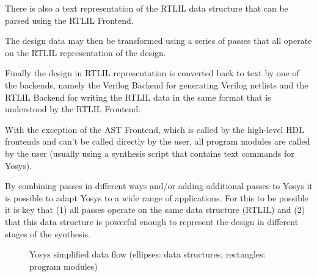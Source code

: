 There is also a text representation of the RTLIL data structure that can be
parsed using the RTLIL Frontend.

The design data may then be transformed using a series of passes that all
operate on the RTLIL representation of the design.

Finally the design in RTLIL representation is converted back to text by one
of the backends, namely the Verilog Backend for generating Verilog netlists
and the RTLIL Backend for writing the RTLIL data in the same format that is
understood by the RTLIL Frontend.

With the exception of the AST Frontend, which is called by the high-level HDL
frontends and can't be called directly by the user, all program modules are
called by the user (usually using a synthesis script that contains text
commands for Yosys).

By combining passes in different ways and/or adding additional passes to Yosys
it is possible to adapt Yosys to a wide range of applications. For this to be
possible it is key that (1) all passes operate on the same data structure
(RTLIL) and (2) that this data structure is powerful enough to represent the design
in different stages of the synthesis.

\begin{figure}[t]
	\hfil
	\caption{Yosys simplified data flow (ellipses: data structures, rectangles: program modules)}
	\label{fig:Overview_flow}
\end{figure}

